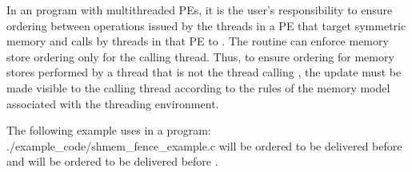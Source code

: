 \begin{apidefinition}
{    In an \openshmem program with multithreaded \acp{PE}, it is the
    user's responsibility to ensure ordering between operations issued by the threads
    in a \ac{PE} that target symmetric memory and calls by threads in that \ac{PE} to
    . The  routine can enforce memory store ordering only for the
    calling thread. Thus, to ensure ordering for memory stores performed by a thread that is
    not the thread calling , the update must be made visible to the
    calling thread according to the rules of the memory model associated with
    the threading environment.
}

\begin{apiexamples}

\apicexample
    {The following example uses  in a \Cstd[11] program: }
    {./example_code/shmem_fence_example.c}
    { will be ordered to be delivered before  and 
    will be ordered to be delivered before .}

\end{apiexamples}

\end{apidefinition}
